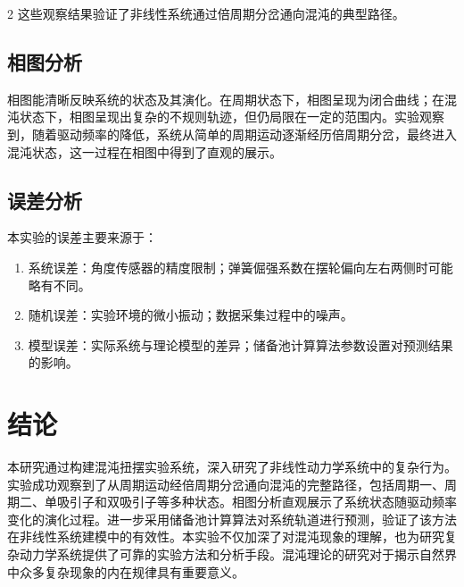 \documentclass[12pt,a4paper]{article}
\begin{document}
\begin{multicols}{2}
    这些观察结果验证了非线性系统通过倍周期分岔通向混沌的典型路径。

    \subsection{\heiti 相图分析}
    \songti
    相图能清晰反映系统的状态及其演化。在周期状态下，相图呈现为闭合曲线；在混沌状态下，相图呈现出复杂的不规则轨迹，但仍局限在一定的范围内。实验观察到，随着驱动频率的降低，系统从简单的周期运动逐渐经历倍周期分岔，最终进入混沌状态，这一过程在相图中得到了直观的展示。
    \subsection{\heiti 误差分析}
    \songti
    本实验的误差主要来源于：
    \begin{enumerate}
        \item 系统误差：角度传感器的精度限制；弹簧倔强系数在摆轮偏向左右两侧时可能略有不同。
        \item 随机误差：实验环境的微小振动；数据采集过程中的噪声。
        \item 模型误差：实际系统与理论模型的差异；储备池计算算法参数设置对预测结果的影响。
    \end{enumerate}

    \section{\heiti 结\quad 论}
    \songti
    本研究通过构建混沌扭摆实验系统，深入研究了非线性动力学系统中的复杂行为。实验成功观察到了从周期运动经倍周期分岔通向混沌的完整路径，包括周期一、周期二、单吸引子和双吸引子等多种状态。相图分析直观展示了系统状态随驱动频率变化的演化过程。进一步采用储备池计算算法对系统轨道进行预测，验证了该方法在非线性系统建模中的有效性。本实验不仅加深了对混沌现象的理解，也为研究复杂动力学系统提供了可靠的实验方法和分析手段。混沌理论的研究对于揭示自然界中众多复杂现象的内在规律具有重要意义。
\end{multicols}
\end{document}
